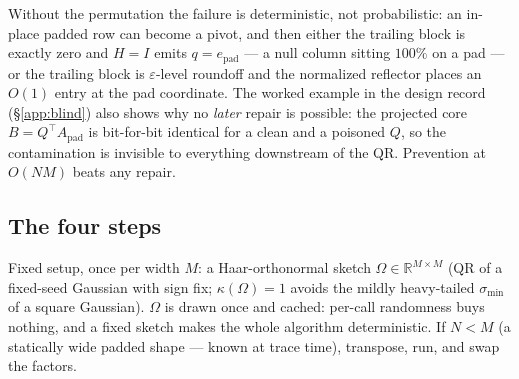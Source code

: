 \documentclass[11pt]{article}
\theoremstyle{definition}
\theoremstyle{remark}
\newcommand{\R}{\mathbb{R}}
\newcommand{\Apad}{A_{\mathrm{pad}}}
\begin{document}
Without the permutation the failure is deterministic, not probabilistic: an in-place padded row can
become a pivot, and then either the trailing block is exactly zero and $H=I$ emits
$q = e_{\mathrm{pad}}$ --- a null column sitting $100\%$ on a pad --- or the trailing block is
$\varepsilon$-level roundoff and the normalized reflector places an $O(1)$ entry at the pad
coordinate. The worked example in the design record (\S\ref{app:blind}) also shows why no
\emph{later} repair is possible: the projected core $B = Q^{\top}\Apad$ is bit-for-bit identical
for a clean and a poisoned $Q$, so the contamination is invisible to everything downstream of the
QR. Prevention at $O(NM)$ beats any repair.

\subsection{The four steps}\label{sec:steps}

Fixed setup, once per width $M$: a Haar-orthonormal sketch $\Omega\in\R^{M\times M}$ (QR of a
fixed-seed Gaussian with sign fix; $\kappa(\Omega)=1$ avoids the mildly heavy-tailed
$\sigma_{\min}$ of a square Gaussian). $\Omega$ is drawn once and cached: per-call randomness buys
nothing, and a fixed sketch makes the whole algorithm deterministic. If $N<M$ (a statically wide
padded shape --- known at trace time), transpose, run, and swap the factors.
\end{document}
